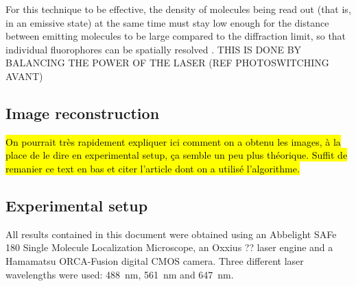 For this technique to be effective, the density of molecules being read out
(that is, in an emissive state) at the same time must stay low
enough for the distance between emitting molecules to be large
compared to the diﬀraction limit, so that individual fluorophores
can be spatially resolved \cite{furstenberg_single-molecule_2013}.
THIS IS DONE BY BALANCING THE POWER OF THE LASER (REF PHOTOSWITCHING AVANT)

\subsection{Image reconstruction}
\hl{On pourrait très rapidement expliquer ici comment on a obtenu les images, à la place de le dire en experimental setup, ça semble un peu plus théorique.
Suffit de remanier ce text en bas et citer l'article dont on a utilisé l'algorithme.}

\subsection{Experimental setup}
All results contained in this document were obtained using an Abbelight SAFe 180 Single Molecule Localization Microscope, an Oxxius ?? laser engine and a Hamamatsu ORCA-Fusion digital CMOS camera.
Three different laser wavelengths were used: \mbox{488 nm}, \mbox{561 nm} and \mbox{647 nm}.

